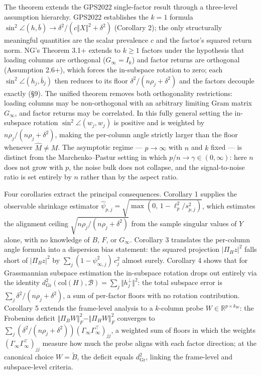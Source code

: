 \documentclass{article}
\theoremstyle{remark}
\begin{document}
The theorem extends the GPS2022 single-factor result through a three-level assumption hierarchy. GPS2022 establishes the $k=1$ formula $\sin^2\angle(h, \bar{b}) \to \delta^2/(c\Vert X\Vert^2 + \delta^2)$ (Corollary 2); the only structurally meaningful quantities are the scalar prevalence $c$ and the factor's squared return norm. NG's Theorem 3.1+ extends to $k \ge 1$ factors under the hypothesis that loading columns are orthogonal ($G_\infty = I_k$) and factor returns are orthogonal (Assumption 2.6+), which forces the in-subspace rotation to zero; each $\sin^2\angle(h_j, \bar{b}_j)$ then reduces to its floor $\delta^2/(n\rho_j + \delta^2)$ and the factors decouple exactly (§9). The unified theorem removes both orthogonality restrictions: loading columns may be non-orthogonal with an arbitrary limiting Gram matrix $G_\infty$, and factor returns may be correlated. In this fully general setting the in-subspace rotation $\sin^2\angle(\hat{w}_j, w_j)$ is positive and is weighted by $n\rho_j/(n\rho_j + \delta^2)$, making the per-column angle strictly larger than the floor whenever $\hat{M} \ne M$. The asymptotic regime — $p \to \infty$ with $n$ and $k$ fixed — is distinct from the Marchenko–Pastur setting in which $p/n \to \gamma \in (0,\infty)$: here $n$ does not grow with $p$, the noise bulk does not collapse, and the signal-to-noise ratio is set entirely by $n$ rather than by the aspect ratio.

Four corollaries extract the principal consequences. Corollary 1 supplies the observable shrinkage estimator $\hat{\psi}_{p,j} = \sqrt{\max(0,\, 1 - \ell_p^2/s_{p,j}^2)}$, which estimates the alignment ceiling $\sqrt{n\rho_j/(n\rho_j + \delta^2)}$ from the sample singular values of $Y$ alone, with no knowledge of $B$, $F$, or $G_\infty$. Corollary 3 translates the per-column angle formula into a dispersion bias statement: the squared projection $|\Pi_H z|^2$ falls short of $|\Pi_B z|^2$ by $\sum_j (1 - \psi_{\infty,j}^2)\, c_j^2$ almost surely. Corollary 4 shows that for Grassmannian subspace estimation the in-subspace rotation drops out entirely via the identity $d_{\mathrm{Gr}}^2(\mathrm{col}(H), \mathcal{B}) = \sum_j \Vert h_j^\perp\Vert^2$: the total subspace error is $\sum_j \delta^2/(n\rho_j + \delta^2)$, a sum of per-factor floors with no rotation contribution. Corollary 5 extends the frame-level analysis to a $k$-column probe $W \in \mathbb{R}^{p \times k_W}$: the Frobenius deficit $\Vert \Pi_B W\Vert_F^2 - \Vert \Pi_H W\Vert_F^2$ converges to $\sum_j (\delta^2/(n\rho_j + \delta^2))(\Gamma_\infty \Gamma_\infty^\top)_{jj}$, a weighted sum of floors in which the weights $(\Gamma_\infty\Gamma_\infty^\top)_{jj}$ measure how much the probe aligns with each factor direction; at the canonical choice $W = \tilde{B}$, the deficit equals $d_{\mathrm{Gr}}^2$, linking the frame-level and subspace-level criteria.
\end{document}
